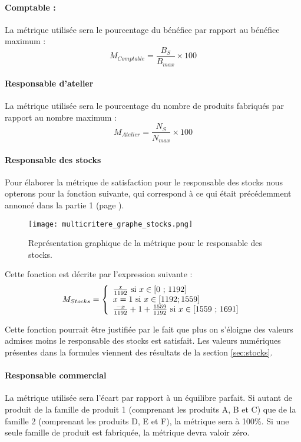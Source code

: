 \paragraph{Comptable :}
La métrique utilisée sera le pourcentage du bénéfice par rapport au bénéfice
maximum :
$$
M_{Comptable} = \frac{B_{S}}{B_{max}} \times 100
$$

\paragraph{Responsable d'atelier}
La métrique utilisée sera le pourcentage du nombre de produits fabriqués par
rapport au nombre maximum :
$$
M_{Atelier} = \frac{N_{S}}{N_{max}} \times 100
$$

\paragraph{Responsable des stocks}
Pour élaborer la métrique de satisfaction pour le responsable des stocks nous
opterons pour la fonction suivante, qui correspond à ce qui était précédemment
annoncé dans la partie 1 (page \pageref{sec:stocks}). 

\begin{figure}[!ht]
\begin{center}
    \texttt{[image: multicritere\_graphe\_stocks.png]}
    \caption{Représentation graphique de la métrique pour le responsable des
	stocks.}
	\end{center}
\end{figure}

Cette fonction est décrite par l'expression suivante :
$$
M_{Stocks} = \left\{ 
    \begin{array}{l l l}
	\frac{x}{1192} \text{ si } x \in \text{[0 ; 1192]} \\
	x=1 \text{ si } x \in [1192 ; 1559]\\
	\frac{-x}{1192}+ 1+\frac{1559}{1192} \text{ si } x \in \text{[1559 ;
	    1691]}\\
    \end{array}
\right.
$$

Cette fonction pourrait être justifiée par le fait que plus on s’éloigne des
valeurs admises moins le responsable des stocks est satisfait. Les valeurs
numériques présentes dans la formules viennent des résultats de la section
\ref{sec:stocks}.


\paragraph{Responsable commercial}
La métrique utilisée sera l'écart par rapport à un équilibre parfait.
Si autant de produit de la famille de produit 1 (comprenant les produits A, B
et C) que de la famille 2 (comprenant les produits D, E et F), la métrique sera
à 100\%.
Si une seule famille de produit est fabriquée, la métrique devra valoir zéro.

